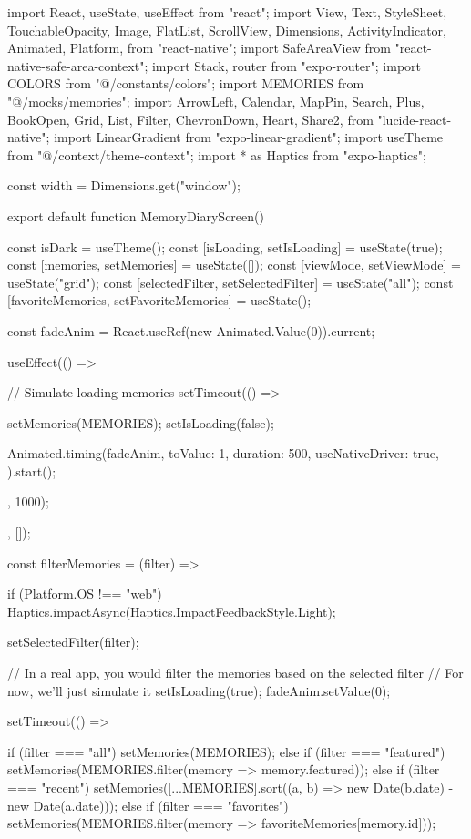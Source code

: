 import React, { useState, useEffect } from "react";
import {
  View,
  Text,
  StyleSheet,
  TouchableOpacity,
  Image,
  FlatList,
  ScrollView,
  Dimensions,
  ActivityIndicator,
  Animated,
  Platform,
} from "react-native";
import { SafeAreaView } from "react-native-safe-area-context";
import { Stack, router } from "expo-router";
import { COLORS } from "@/constants/colors";
import { MEMORIES } from "@/mocks/memories";
import {
  ArrowLeft,
  Calendar,
  MapPin,
  Search,
  Plus,
  BookOpen,
  Grid,
  List,
  Filter,
  ChevronDown,
  Heart,
  Share2,
} from "lucide-react-native";
import { LinearGradient } from "expo-linear-gradient";
import { useTheme } from "@/context/theme-context";
import * as Haptics from "expo-haptics";

const { width } = Dimensions.get("window");

export default function MemoryDiaryScreen() {
  const { isDark } = useTheme();
  const [isLoading, setIsLoading] = useState(true);
  const [memories, setMemories] = useState([]);
  const [viewMode, setViewMode] = useState("grid");
  const [selectedFilter, setSelectedFilter] = useState("all");
  const [favoriteMemories, setFavoriteMemories] = useState({});
  
  const fadeAnim = React.useRef(new Animated.Value(0)).current;
  
  useEffect(() => {
    // Simulate loading memories
    setTimeout(() => {
      setMemories(MEMORIES);
      setIsLoading(false);
      
      Animated.timing(fadeAnim, {
        toValue: 1,
        duration: 500,
        useNativeDriver: true,
      }).start();
    }, 1000);
  }, []);
  
  const filterMemories = (filter) => {
    if (Platform.OS !== "web") {
      Haptics.impactAsync(Haptics.ImpactFeedbackStyle.Light);
    }
    
    setSelectedFilter(filter);
    
    // In a real app, you would filter the memories based on the selected filter
    // For now, we'll just simulate it
    setIsLoading(true);
    fadeAnim.setValue(0);
    
    setTimeout(() => {
      if (filter === "all") {
        setMemories(MEMORIES);
      } else if (filter === "featured") {
        setMemories(MEMORIES.filter(memory => memory.featured));
      } else if (filter === "recent") {
        setMemories([...MEMORIES].sort((a, b) => new Date(b.date) - new Date(a.date)));
      } else if (filter === "favorites") {
        setMemories(MEMORIES.filter(memory => favoriteMemories[memory.id]));
      }
      
}}}
